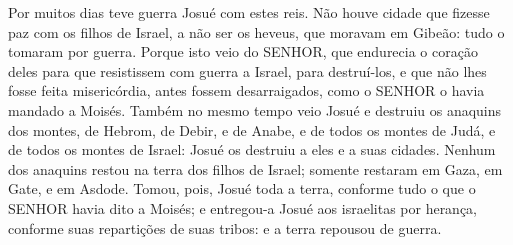 {Por muitos dias teve guerra Josué com estes reis.
Não houve cidade que fizesse paz com os filhos de Israel, a não ser os heveus, que moravam em Gibeão: tudo o tomaram por guerra.
Porque isto veio do SENHOR, que endurecia o coração deles para que resistissem com guerra a Israel, para destruí-los, e que não lhes fosse feita misericórdia, antes fossem desarraigados, como o SENHOR o havia mandado a Moisés.
Também no mesmo tempo veio Josué e destruiu os anaquins dos montes, de Hebrom, de Debir, e de Anabe, e de todos os montes de Judá, e de todos os montes de Israel: Josué os destruiu a eles e a suas cidades.
Nenhum dos anaquins restou na terra dos filhos de Israel; somente restaram em Gaza, em Gate, e em Asdode.
Tomou, pois, Josué toda a terra, conforme tudo o que o SENHOR havia dito a Moisés; e entregou-a Josué aos israelitas por herança, conforme suas repartições de suas tribos: e a terra repousou de guerra. %

\par }

